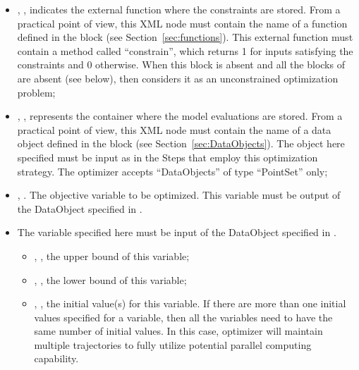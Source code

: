 \begin{itemize}
\item {}, ,
        indicates the external function where the constraints are stored. From a practical point of view, this XML node must contain the 
        name of a function defined in the  block (see Section~\ref{sec:functions}). This external function must 
        contain a method called ``constrain'', which returns 1 for inputs satisfying the constraints and 0 otherwise. When this block is 
        absent and all the  blocks of  are absent (see below), then  considers 
        it as an unconstrained optimization problem;
\item {}, ,
        represents the container where the model evaluations are stored.
        From a practical point of view, this XML node must contain the name of
        a data object defined in the  block (see
        Section~\ref{sec:DataObjects}). The object here specified must be
        input as   in the Steps that employ this optimization strategy.
        The  optimizer accepts ``DataObjects'' of type ``PointSet'' only;
\item {}, . The objective variable to be optimized. This variable must be 
output of the DataObject specified in .
\end{itemize}
\begin{itemize}
\item \variableDescription
 The variable specified here must be input of the DataObject specified in .
 \variableChildrenIntro
 \begin{itemize}
    \item {}, , the upper bound of this variable;
    \item {}, , the lower bound of this variable;
    \item {}, , the initial value(s) for this variable. If there are more 
    than one initial values specified for a variable, then all the variables need to have the same number of initial values. In this case, 
     optimizer will maintain multiple trajectories to fully utilize potential parallel computing capability.
  \end{itemize}
\end{itemize}
